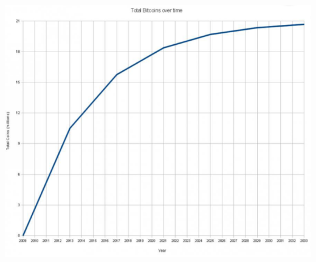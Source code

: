 \begin{minipage}{0.45\linewidth}
	\includegraphics[width=\linewidth]{images/bitcoin3.png}
\end{minipage}

\clearpage
\pagebreak